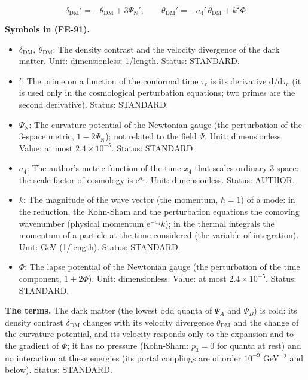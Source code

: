 \documentclass[
  10pt,
]{article}
\providecommand{\tightlist}{%
  \setlength{\itemsep}{0pt}\setlength{\parskip}{0pt}}
\begin{document}
\[
\delta_{\mathrm{DM}}' = -\theta_{\mathrm{DM}} + 3\Psi_{\mathrm{N}}',\qquad \theta_{\mathrm{DM}}' =
 -a_4'\,\theta_{\mathrm{DM}} + k^2\Phi \tag{FE-91}
\]

\textbf{Symbols in (FE-91).}

\begin{itemize}
\tightlist
\item
  \(\delta_{\mathrm{DM}},\ \theta_{\mathrm{DM}}\): The density contrast
  and the velocity divergence of the dark matter. Unit: dimensionless;
  1/length. Status: STANDARD.
\item
  \({}'\): The prime on a function of the conformal time
  \(\tau_{\mathrm{c}}\) is its derivative
  \(\mathrm{d}/\mathrm{d}\tau_{\mathrm{c}}\) (it is used only in the
  cosmological perturbation equations; two primes are the second
  derivative). Status: STANDARD.
\item
  \(\Psi_{\mathrm{N}}\): The curvature potential of the Newtonian gauge
  (the perturbation of the 3-space metric, \(1 - 2\Psi_{\mathrm{N}}\));
  not related to the field \(\Psi\). Unit: dimensionless. Value: at most
  \(2.4\times10^{-5}\). Status: STANDARD.
\item
  \(a_4\): The author's metric function of the time \(x_4\) that scales
  ordinary 3-space: the scale factor of cosmology is
  \(\mathrm{e}^{a_4}\). Unit: dimensionless. Status: AUTHOR.
\item
  \(k\): The magnitude of the wave vector (the momentum, \(\hbar = 1\))
  of a mode: in the reduction, the Kohn-Sham and the perturbation
  equations the comoving wavenumber (physical momentum
  \(\mathrm{e}^{-a_4}k\)); in the thermal integrals the momentum of a
  particle at the time considered (the variable of integration). Unit:
  GeV (1/length). Status: STANDARD.
\item
  \(\Phi\): The lapse potential of the Newtonian gauge (the perturbation
  of the time component, \(1 + 2\Phi\)). Unit: dimensionless. Value: at
  most \(2.4\times10^{-5}\). Status: STANDARD.
\end{itemize}

\textbf{The terms.} The dark matter (the lowest odd quanta of \(\Psi_A\)
and \(\Psi_B\)) is cold: its density contrast \(\delta_{\mathrm{DM}}\)
changes with its velocity divergence \(\theta_{\mathrm{DM}}\) and the
change of the curvature potential, and its velocity responds only to the
expansion and to the gradient of \(\Phi\); it has no pressure
(Kohn-Sham: \(p_3 = 0\) for quanta at rest) and no interaction at these
energies (its portal couplings are of order \(10^{-9}\) GeV\(^{-2}\) and
below). Status: STANDARD.
\end{document}

